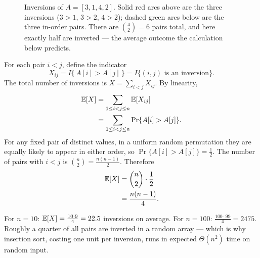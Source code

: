 \begin{figure}[htbp]
\centering
{}
\caption{Inversions of $A=[3,1,4,2]$. Solid red arcs above are the three
inversions ($3{>}1$, $3{>}2$, $4{>}2$); dashed green arcs below are the three
in-order pairs. There are $\binom{4}{2}=6$ pairs total, and here exactly half are
inverted --- the average outcome the calculation below predicts.}
\label{ch05:fig-inversions}
\end{figure}

For each pair $i < j$, define the indicator
\[
  X_{ij} = I\{\,A[i] > A[j]\,\} = I\{(i,j)\text{ is an inversion}\}.
\]
The total number of inversions is $X = \sum_{i<j} X_{ij}$. By linearity,
\begin{align*}
  \mathbb{E}[X] &= \sum_{1 \le i < j \le n} \mathbb{E}[X_{ij}] \\
        &= \sum_{1 \le i < j \le n} \Pr\{A[i] > A[j]\}.
\end{align*}
For any fixed pair of distinct values, in a uniform random permutation they are
equally likely to appear in either order, so $\Pr\{A[i] > A[j]\} = \tfrac12$. The
number of pairs with $i<j$ is $\binom{n}{2} = \tfrac{n(n-1)}{2}$. Therefore
\begin{align*}
  \mathbb{E}[X] &= \binom{n}{2} \cdot \frac{1}{2} \\
        &= \frac{n(n-1)}{4}.
\end{align*}

\begin{example}
For $n = 10$: $\mathbb{E}[X] = \tfrac{10\cdot 9}{4} = 22.5$ inversions on average. For
$n = 100$: $\tfrac{100\cdot 99}{4} = 2475$. Roughly a quarter of all pairs are
inverted in a random array --- which is why insertion sort, costing one unit per
inversion, runs in expected $\Theta(n^2)$ time on random input. 
\end{example}

